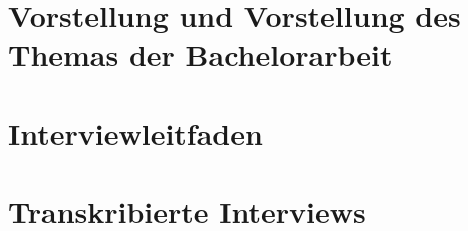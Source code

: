 \pagestyle{fancy} \fancyhf{}  




\chapter{Vorstellung und Vorstellung des Themas der Bachelorarbeit}



\chapter{Interviewleitfaden}



\chapter{Transkribierte Interviews}



